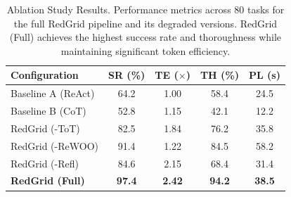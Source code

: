 
\begin{table}[htbp]
  \centering
  \caption{Ablation Study Results. Performance metrics across 80 tasks for the full RedGrid pipeline and its degraded versions. RedGrid (Full) achieves the highest success rate and thoroughness while maintaining significant token efficiency.}
  \label{tab:ablation-results}
  \begin{tabular}{lcccc}
    \toprule
    \textbf{Configuration} & \textbf{SR (\%)} & \textbf{TE ($\times$)} & \textbf{TH (\%)} & \textbf{PL (s)} \\
    \midrule
    Baseline A (ReAct) & 64.2 & 1.00 & 58.4 & 24.5 \\
    Baseline B (CoT) & 52.8 & 1.15 & 42.1 & 12.2 \\
    \midrule
    RedGrid (-ToT) & 82.5 & 1.84 & 76.2 & 35.8 \\
    RedGrid (-ReWOO) & 91.4 & 1.22 & 84.5 & 58.2 \\
    RedGrid (-Refl) & 84.6 & 2.15 & 68.4 & 31.4 \\
    \midrule
    \textbf{RedGrid (Full)} & \textbf{97.4} & \textbf{2.42} & \textbf{94.2} & \textbf{38.5} \\
    \bottomrule
  \end{tabular}
\end{table}
